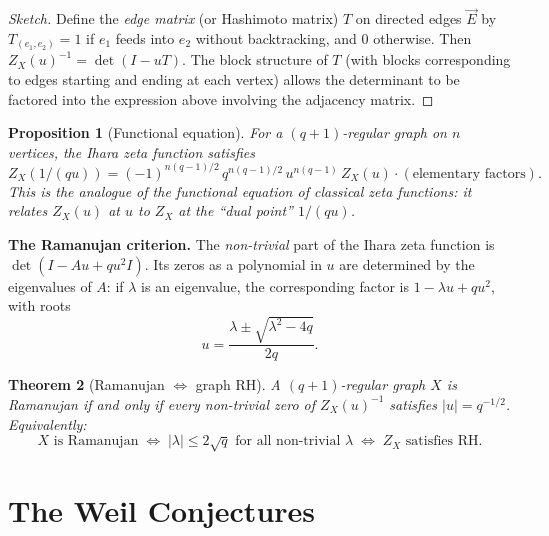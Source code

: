 \documentclass[11pt,a4paper]{article}
\theoremstyle{plain}
\newtheorem{theorem}{Theorem}[section]
\newtheorem{proposition}[theorem]{Proposition}
\theoremstyle{definition}
\begin{document}
\begin{proof}[Sketch]
Define the \emph{edge matrix} (or Hashimoto matrix) $T$ on directed
edges $\vec{E}$ by $T_{(e_1, e_2)} = 1$ if $e_1$ feeds into $e_2$
without backtracking, and $0$ otherwise. Then
$Z_X(u)^{-1} = \det(I - uT)$. The block structure of $T$ (with
blocks corresponding to edges starting and ending at each vertex)
allows the determinant to be factored into the expression above
involving the adjacency matrix.
\end{proof}

\begin{tcolorbox}[breakable, colback=black!5, colframe=black!5,
  boxrule=0pt, sharp corners]
\begin{proposition}[Functional equation]
\label{prop:ihara-func}
For a $(q+1)$-regular graph on $n$ vertices, the Ihara zeta function
satisfies
\[
  Z_X(1/(qu))
  = (-1)^{n(q-1)/2}\, q^{n(q-1)/2}\, u^{n(q-1)}\, Z_X(u)
  \cdot (\text{elementary factors}).
\]
This is the analogue of the functional equation of classical zeta
functions: it relates $Z_X(u)$ at $u$ to $Z_X$ at the ``dual point''
$1/(qu)$.
\end{proposition}
\end{tcolorbox}

\begin{tcolorbox}[breakable, colback=yellow!12, colframe=yellow!12,
  boxrule=0pt, sharp corners]
\textbf{The Ramanujan criterion.}
The \emph{non-trivial} part of the Ihara zeta function is
$\det(I - Au + qu^2 I)$. Its zeros as a polynomial in $u$ are
determined by the eigenvalues of $A$: if $\lambda$ is an eigenvalue,
the corresponding factor is $1 - \lambda u + qu^2$, with roots
\[
  u = \frac{\lambda \pm \sqrt{\lambda^2 - 4q}}{2q}.
\]
\begin{theorem}[Ramanujan $\Leftrightarrow$ graph RH]
\label{thm:ramanujan-rh}
A $(q+1)$-regular graph $X$ is \emph{Ramanujan} if and only if every
non-trivial zero of $Z_X(u)^{-1}$ satisfies $|u| = q^{-1/2}$.
Equivalently:
\[
  X \text{ is Ramanujan}
  \;\Longleftrightarrow\;
  |\lambda| \leq 2\sqrt{q} \text{ for all non-trivial } \lambda
  \;\Longleftrightarrow\;
  Z_X \text{ satisfies RH}.
\]
\end{theorem}
\end{tcolorbox}


\section{The Weil Conjectures}
\label{sec:weil}
\end{document}
